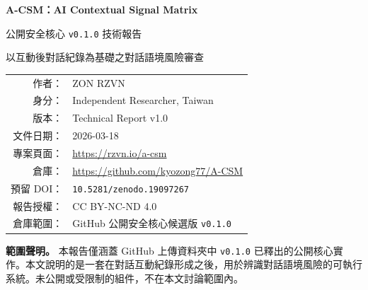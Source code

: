 \documentclass[11pt,a4paper]{article}
\begin{document}
\begin{titlepage}
\centering
{\Large \textbf{A-CSM：AI Contextual Signal Matrix}\par}
\vspace{0.8em}
{\large 公開安全核心 \texttt{v0.1.0} 技術報告\par}
\vspace{0.5em}
{\normalsize 以互動後對話紀錄為基礎之對話語境風險審查\par}
\vspace{2em}

\begin{tabular}{rl}
作者： & ZON RZVN \\
身分： & Independent Researcher, Taiwan \\
版本： & Technical Report v1.0 \\
文件日期： & 2026-03-18 \\
專案頁面： & \url{https://rzvn.io/a-csm} \\
倉庫： & \url{https://github.com/kyozong77/A-CSM} \\
預留 DOI： & \texttt{10.5281/zenodo.19097267} \\
報告授權： & CC BY-NC-ND 4.0 \\
倉庫範圍： & GitHub 公開安全核心候選版 \texttt{v0.1.0} \\
\end{tabular}

\vfill

\begin{minipage}{0.9\linewidth}
\small
\textbf{範圍聲明。} 本報告僅涵蓋 GitHub 上傳資料夾中 \texttt{v0.1.0} 已釋出的公開核心實作。本文說明的是一套在對話互動紀錄形成之後，用於辨識對話語境風險的可執行系統。未公開或受限制的組件，不在本文討論範圍內。
\end{minipage}

\vfill
\end{titlepage}
\end{document}
